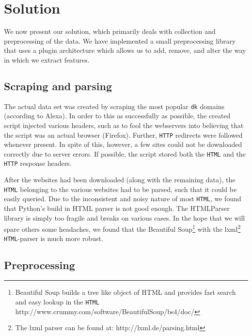 \section{Solution}
\label{sec:solution}

We now present our solution, which primarily deals with collection and preprocessing of the data. We have implemented a small preprocessing library that uses a plugin architecture which allows us to add, remove, and alter the way in which we extract features.

\subsection{Scraping and parsing}
\label{subsec:scraping}


The actual data set was created by scraping the most popular \texttt{dk} domains (according to Alexa). In order to this as successfully as possible, the created script injected various headers, such as to fool the webservers into believing that the script was an actual browser (Firefox). Further, \texttt{HTTP} redirects were followed whenever present. In spite of this, however, a few sites could not be downloaded correctly due to server errors. If possible, the script stored both the \texttt{HTML} and the \texttt{HTTP} response headers.

After the websites had been downloaded (along with the remaining data), the \texttt{HTML} belonging to the various websites had to be parsed, such that it could be easily queried. Due to the inconsistent and noisy nature of most \texttt{HTML}, we found that Python's build in HTML parser is not good enough. The HTMLParser library is simply too fragile and breaks on various cases. In the hope that we will spare others some headaches, we found that the Beautiful Soup\footnote{Beautiful Soup builds a tree like object of HTML and provides fast search and easy lookup in the \texttt{HTML} http://www.crummy.com/software/BeautifulSoup/bs4/doc/} with the lxml\footnote{The lxml parser can be found at: http://lxml.de/parsing.html} \texttt{HTML}-parser is much more robust.

\subsection{Preprocessing}
\label{subsec:preprocessing}

